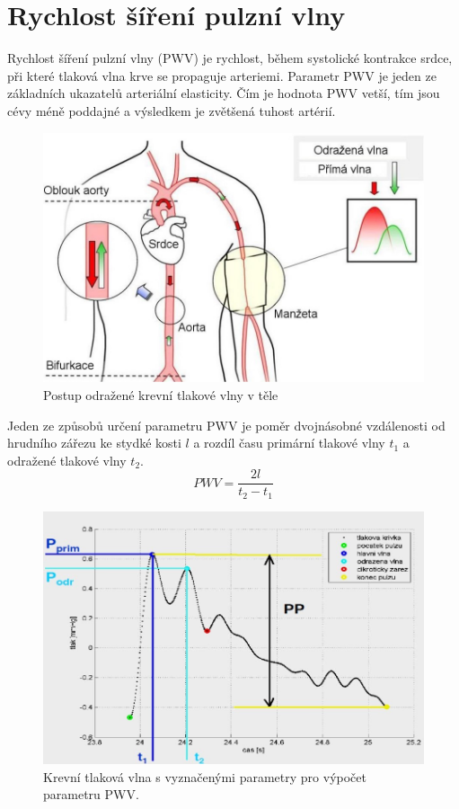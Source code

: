\section{Rychlost šíření pulzní vlny}
Rychlost šíření pulzní vlny (PWV) je rychlost, během systolické kontrakce srdce, při které tlaková vlna krve se propaguje arteriemi. Parametr PWV je jeden ze základních ukazatelů arteriální
elasticity. Čím je hodnota PWV vetší, tím jsou cévy méně poddajné a výsledkem je zvětšená tuhost artérií.\cite{cite:6}
\begin{figure}[H]
    \caption{Postup odražené krevní tlakové vlny v těle \cite{cite:5}}
    \includegraphics[width=1\textwidth]{pictures/pwv_body.jpg}
\end{figure}
Jeden ze způsobů určení parametru PWV je poměr dvojnásobné vzdálenosti od hrudního zářezu ke stydké kosti $l$ a rozdíl času primární tlakové vlny $t_1$ a odražené tlakové vlny $t_2$.
\begin{equation} \label{eq:pwv}
    PWV = \frac{2l}{t_2 - t_1}
\end{equation}
\begin{figure}[H]
    \caption{Krevní tlaková vlna s vyznačenými parametry pro výpočet parametru PWV. \cite{cite:7}}
    \includegraphics[width=1\textwidth]{pictures/pwv_pressure_wave.jpg}
\end{figure}
